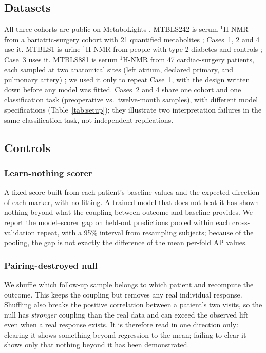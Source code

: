 \documentclass[conference]{IEEEtran}
\begin{document}
\subsection{Datasets}
All three cohorts are public on MetaboLights \cite{haug2020}. MTBLS242 is
serum $^1$H-NMR from a bariatric-surgery cohort with 21 quantified
metabolites \cite{mtbls242, gralka2015}; Cases~1, 2 and 4 use it. MTBLS1 is
urine $^1$H-NMR from people with type 2 diabetes and controls
\cite{salek2007}; Case~3 uses it. MTBLS881 is serum $^1$H-NMR from 47
cardiac-surgery patients, each sampled at two anatomical sites (left atrium,
declared primary, and pulmonary artery) \cite{maltesen2020}; we used it only
to repeat Case~1, with the design written down before any model was fitted.
Cases~2 and 4 share one cohort and one classification task (preoperative
vs.\ twelve-month samples), with different model specifications
(Table~\ref{tab:setup}); they illustrate two interpretation failures in the
same classification task, not independent replications.

\subsection{Controls}
\subsubsection{Learn-nothing scorer} A fixed score built from each patient's
baseline values and the expected direction of each marker, with no fitting.
A trained model that does not beat it has shown nothing beyond what the
coupling between outcome and baseline provides. We report the model--scorer
gap on held-out predictions pooled within each cross-validation repeat, with
a 95\% interval from resampling subjects; because of the pooling, the gap is
not exactly the difference of the mean per-fold AP values.

\subsubsection{Pairing-destroyed null} We shuffle which follow-up sample
belongs to which patient and recompute the outcome. This keeps the coupling
but removes any real individual response. Shuffling also breaks the positive
correlation between a patient's two visits, so the null has \emph{stronger}
coupling than the real data and can exceed the observed lift even when a
real response exists. It is therefore read in one direction only: clearing
it shows something beyond regression to the mean; failing to clear it shows
only that nothing beyond it has been demonstrated.
\end{document}

